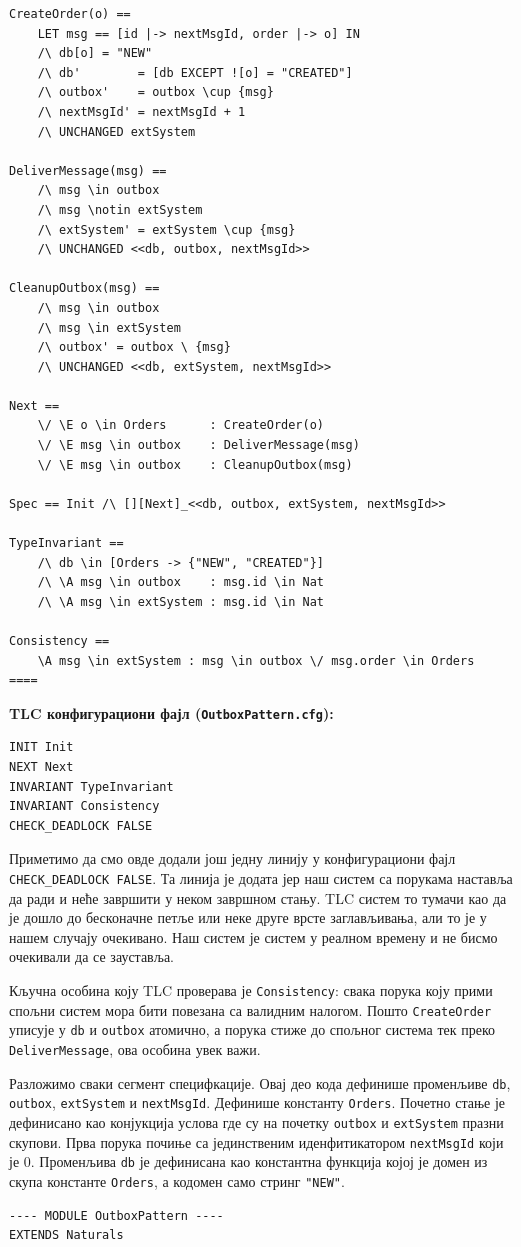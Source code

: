 \begin{primer}
\begin{lstlisting}
CreateOrder(o) ==
    LET msg == [id |-> nextMsgId, order |-> o] IN
    /\ db[o] = "NEW"
    /\ db'        = [db EXCEPT ![o] = "CREATED"]
    /\ outbox'    = outbox \cup {msg}
    /\ nextMsgId' = nextMsgId + 1
    /\ UNCHANGED extSystem

DeliverMessage(msg) ==
    /\ msg \in outbox
    /\ msg \notin extSystem
    /\ extSystem' = extSystem \cup {msg}
    /\ UNCHANGED <<db, outbox, nextMsgId>>

CleanupOutbox(msg) ==
    /\ msg \in outbox
    /\ msg \in extSystem
    /\ outbox' = outbox \ {msg}
    /\ UNCHANGED <<db, extSystem, nextMsgId>>

Next ==
    \/ \E o \in Orders      : CreateOrder(o)
    \/ \E msg \in outbox    : DeliverMessage(msg)
    \/ \E msg \in outbox    : CleanupOutbox(msg)

Spec == Init /\ [][Next]_<<db, outbox, extSystem, nextMsgId>>

TypeInvariant ==
    /\ db \in [Orders -> {"NEW", "CREATED"}]
    /\ \A msg \in outbox    : msg.id \in Nat
    /\ \A msg \in extSystem : msg.id \in Nat

Consistency ==
    \A msg \in extSystem : msg \in outbox \/ msg.order \in Orders
====
\end{lstlisting}

\textbf{TLC конфигурациони фајл (\texttt{OutboxPattern.cfg}):}
\begin{lstlisting}
INIT Init
NEXT Next
INVARIANT TypeInvariant
INVARIANT Consistency
CHECK_DEADLOCK FALSE
\end{lstlisting}
Приметимо да смо овде додали још једну линију у конфигурациони фајл \\
\texttt{CHECK\_DEADLOCK FALSE}. Та линија је додата јер наш систем са порукама наставља да ради
и неће завршити у неком завршном стању. TLC систем то тумачи као да је дошло 
до бесконачне петље или неке друге врсте заглављивања, али то је у нашем случају очекивано.
Наш систем је систем у реалном времену и не бисмо очекивали да се зауставља.


Кључна особина коју TLC проверава је \texttt{Consistency}: свака порука коју прими спољни систем мора бити повезана са валидним налогом.
Пошто \texttt{CreateOrder} уписује у \texttt{db} и \texttt{outbox} атомично, а порука стиже до спољног система тек преко \texttt{DeliverMessage}, ова особина увек важи.

Разложимо сваки сегмент специфкације. Овај део кода дефинише променљиве \texttt{db}, \texttt{outbox}, \texttt{extSystem} и \texttt{nextMsgId}.
Дефинише константу \texttt{Orders}. Почетно стање је дефинисано као конјукција услова где су на почетку \texttt{outbox}
и \texttt{extSystem} празни скупови. Прва порука почиње са јединственим иденфитикатором \texttt{nextMsgId} који је 0.
Променљива \texttt{db} је дефинисана као константна функција којој је домен из скупа константе \texttt{Orders}, а кодомен
само стринг \texttt{"NEW"}.
\begin{lstlisting}
---- MODULE OutboxPattern ----
EXTENDS Naturals


\end{lstlisting}
\end{primer}
